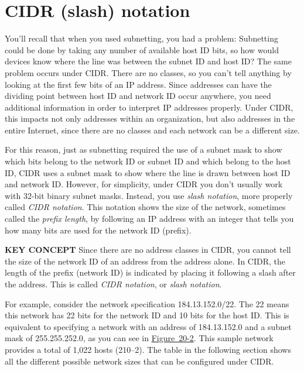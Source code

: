 \section{CIDR (slash) notation}

\protect\hypertarget{ch20s02.htmlux5cux23idx-CHP-20-0763}{}{}\protect\hypertarget{ch20s02.htmlux5cux23idx-CHP-20-0764}{}{}You'll
recall that when you used subnetting, you had a problem: Subnetting
could be done by taking any number of available host ID bits, so how
would devices know where the line was between the subnet ID and host ID?
The same problem occurs under CIDR. There are no classes, so you can't
tell anything by looking at the first few bits of an IP address. Since
addresses can have the dividing point between host ID and network ID
occur anywhere, you need additional information in order to interpret IP
addresses properly. Under CIDR, this impacts not only addresses within
an organization, but also addresses in the entire Internet, since there
are no classes and each network can be a different size.

For this reason, just as subnetting required the use of a subnet mask to
show which bits belong to the network ID or subnet ID and which belong
to the host ID, CIDR uses a subnet mask to show where the line is drawn
between host ID and network ID. However, for simplicity, under CIDR you
don't usually work with 32-bit binary subnet masks. Instead, you use
{\emph{slash notation}}, more properly called {\emph{CIDR notation}}.
This notation shows the size of the network, sometimes called the
\protect\hypertarget{ch20s02.htmlux5cux23idx-CHP-20-0765}{}{}{\emph{prefix
length}}, by following an IP address with an integer that tells you how
many bits are used for the network ID (prefix).


{\textbf{KEY CONCEPT}} Since there are no address classes in CIDR, you
cannot tell the size of the network ID of an address from the address
alone. In CIDR, the length of the prefix (network ID) is indicated by
placing it following a
\protect\hypertarget{ch20s02.htmlux5cux23idx-CHP-20-0766}{}{}slash after
the address. This is called
\protect\hypertarget{ch20s02.htmlux5cux23idx-CHP-20-0767}{}{}{\emph{CIDR
notation}}, or {\emph{slash notation}}.

For example, consider the network specification 184.13.152.0/22. The 22
means this network has 22 bits for the network ID and 10 bits for the
host ID. This is equivalent to specifying a network with an address of
184.13.152.0 and a subnet mask of 255.255.252.0, as you can see in
\protect\hyperlink{ch20s02.htmlux5cux23cidr_slash_notation_and_its_subnet_mask_}{Figure~20-2}.
This sample network provides a total of 1,022 hosts (210--2). The table
in the following section shows all the different possible network sizes
that can be configured under CIDR.

